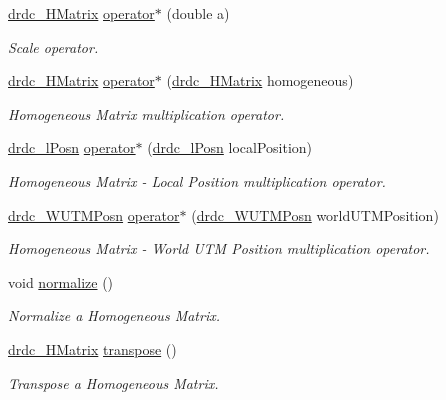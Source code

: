 \begin{CompactItemize}
\hyperlink{classdrdc__HMatrix}{drdc\_\-HMatrix} \hyperlink{classdrdc__HMatrix_9125f22fe1c846f0fe33d3bd2782f1e6}{operator$\ast$} (double a)
\begin{CompactList}\small\item\em Scale operator. \item\end{CompactList}\item 
\hyperlink{classdrdc__HMatrix}{drdc\_\-HMatrix} \hyperlink{classdrdc__HMatrix_fa022b048b7270e7e09c8e8d25e172f5}{operator$\ast$} (\hyperlink{classdrdc__HMatrix}{drdc\_\-HMatrix} homogeneous)
\begin{CompactList}\small\item\em Homogeneous Matrix multiplication operator. \item\end{CompactList}\item 
\hyperlink{classdrdc__lPosn}{drdc\_\-lPosn} \hyperlink{classdrdc__HMatrix_6aa7d1bd902154022b03a8b15ee7afa6}{operator$\ast$} (\hyperlink{classdrdc__lPosn}{drdc\_\-lPosn} localPosition)
\begin{CompactList}\small\item\em Homogeneous Matrix - Local Position multiplication operator. \item\end{CompactList}\item 
\hyperlink{classdrdc__WUTMPosn}{drdc\_\-WUTMPosn} \hyperlink{classdrdc__HMatrix_c949f0bedceffa08288465649ee14dfa}{operator$\ast$} (\hyperlink{classdrdc__WUTMPosn}{drdc\_\-WUTMPosn} worldUTMPosition)
\begin{CompactList}\small\item\em Homogeneous Matrix - World UTM Position multiplication operator. \item\end{CompactList}\item 
void \hyperlink{classdrdc__HMatrix_b123740bea69ad0119682771d0cce7a5}{normalize} ()
\begin{CompactList}\small\item\em Normalize a Homogeneous Matrix. \item\end{CompactList}\item 
\hyperlink{classdrdc__HMatrix}{drdc\_\-HMatrix} \hyperlink{classdrdc__HMatrix_9d8593f3e84fb400bfd27dc48e137934}{transpose} ()
\begin{CompactList}\small\item\em Transpose a Homogeneous Matrix. \item\end{CompactList}\item 

\end{CompactItemize}
